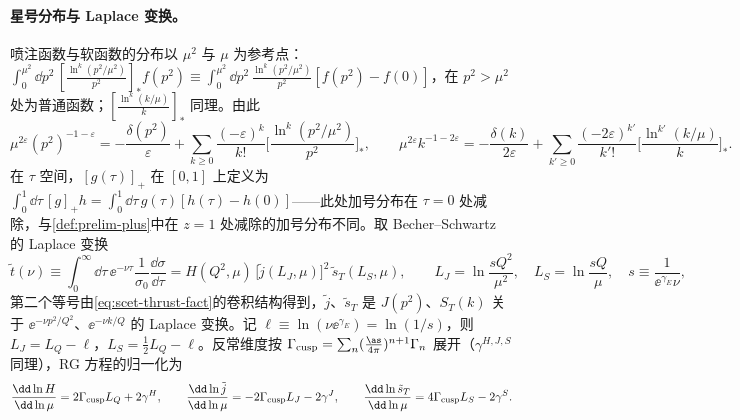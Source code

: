 \paragraph{星号分布与 Laplace 变换。}
喷注函数与软函数的分布以 $\mu^2$ 与 $\mu$ 为参考点：
$\int_0^{\mu^2}\dd p^2\,[\frac{\ln^k(p^2/\mu^2)}{p^2}]_*f(p^2)\equiv\int_0^{\mu^2}\dd p^2\,\frac{\ln^k(p^2/\mu^2)}{p^2}[f(p^2)-f(0)]$，在 $p^2>\mu^2$ 处为普通函数；$[\frac{\ln^k(k/\mu)}{k}]_*$ 同理。由此
\begin{equation}\label{eq:scet-distid}
\mu^{2\varepsilon}(p^2)^{-1-\varepsilon}=-\frac{\delta(p^2)}{\varepsilon}+\sum_{k\ge0}\frac{(-\varepsilon)^k}{k!}\Big[\frac{\ln^k(p^2/\mu^2)}{p^2}\Big]_*,\qquad
\mu^{2\varepsilon}k^{-1-2\varepsilon}=-\frac{\delta(k)}{2\varepsilon}+\sum_{k'\ge0}\frac{(-2\varepsilon)^{k'}}{k'!}\Big[\frac{\ln^{k'}(k/\mu)}{k}\Big]_* .
\end{equation}
在 $\tau$ 空间，$[g(\tau)]_+$ 在 $[0,1]$ 上定义为 $\int_0^1\dd\tau\,[g]_+h=\int_0^1\dd\tau\,g(\tau)[h(\tau)-h(0)]$——此处加号分布在 $\tau=0$ 处减除，与\cref{def:prelim-plus}中在 $z=1$ 处减除的加号分布不同。取 Becher--Schwartz 的 Laplace 变换\cite[附录~B]{BecherSchwartz2008}
\begin{equation}\label{eq:scet-laplace}
\tilde t(\nu)\equiv\int_0^\infty\dd\tau\,\ee^{-\nu\tau}\frac{1}{\sigma_0}\frac{\dd\sigma}{\dd\tau}=H(Q^2,\mu)\,\big[\tilde j(L_J,\mu)\big]^2\,\tilde s_T(L_S,\mu),\qquad
L_J=\ln\frac{sQ^2}{\mu^2},\quad L_S=\ln\frac{sQ}{\mu},\quad s\equiv\frac{1}{\ee^{\gamma_E}\nu},
\end{equation}
第二个等号由\cref{eq:scet-thrust-fact}的卷积结构得到，$\tilde j$、$\tilde s_T$ 是 $J(p^2)$、$S_T(k)$ 关于 $\ee^{-\nu p^2/Q^2}$、$\ee^{-\nu k/Q}$ 的 Laplace 变换。记 $\ell\equiv\ln(\nu\ee^{\gamma_E})=\ln(1/s)$，则 $L_J=L_Q-\ell$，$L_S=\frac12L_Q-\ell$。反常维度按 $\Gamma_{\rm cusp}=\sum_n(\frac{\as}{4\pi})^{n+1}\Gamma_n$ 展开（$\gamma^{H,J,S}$ 同理），RG 方程的归一化为
\begin{equation}\label{eq:scet-RGE}
\frac{\dd\ln H}{\dd\ln\mu}=2\Gamma_{\rm cusp}L_Q+2\gamma^H,\qquad
\frac{\dd\ln\tilde j}{\dd\ln\mu}=-2\Gamma_{\rm cusp}L_J-2\gamma^J,\qquad
\frac{\dd\ln\tilde s_T}{\dd\ln\mu}=4\Gamma_{\rm cusp}L_S-2\gamma^S .
\end{equation}

